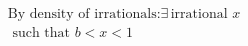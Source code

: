 \documentclass[preview]{standalone}
\begin{document}
\begin{align*}
\text{By density of irrationals:} \exists\, \text{irrational } x \\ \text{ such that } b < x < 1
\end{align*}
\end{document}

